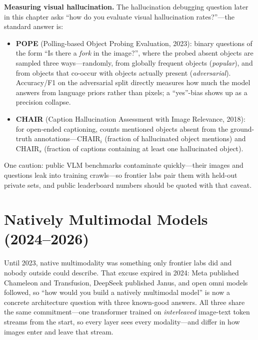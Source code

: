 \textbf{Measuring visual hallucination.} The hallucination debugging question later in this chapter asks ``how do you evaluate visual hallucination rates?''---the standard answer is:

\begin{itemize}
    \item \textbf{POPE} (Polling-based Object Probing Evaluation, 2023): binary questions of the form ``Is there a \textit{fork} in the image?'', where the probed absent objects are sampled three ways---randomly, from globally frequent objects (\textit{popular}), and from objects that co-occur with objects actually present (\textit{adversarial}). Accuracy/F1 on the adversarial split directly measures how much the model answers from language priors rather than pixels; a ``yes''-bias shows up as a precision collapse.
    \item \textbf{CHAIR} (Caption Hallucination Assessment with Image Relevance, 2018): for open-ended captioning, counts mentioned objects absent from the ground-truth annotations---CHAIR$_i$ (fraction of hallucinated object mentions) and CHAIR$_s$ (fraction of captions containing at least one hallucinated object).
\end{itemize}

One caution: public VLM benchmarks contaminate quickly---their images and questions leak into training crawls---so frontier labs pair them with held-out private sets, and public leaderboard numbers should be quoted with that caveat.

\section{Natively Multimodal Models (2024--2026)}
\label{sec:native_multimodal}

Until 2023, native multimodality was something only frontier labs did and nobody outside could describe. That excuse expired in 2024: Meta published Chameleon and Transfusion, DeepSeek published Janus, and open omni models followed, so ``how would you build a natively multimodal model'' is now a concrete architecture question with three known-good answers. All three share the same commitment---one transformer trained on \textit{interleaved} image-text token streams from the start, so every layer sees every modality---and differ in how images enter and leave that stream.

